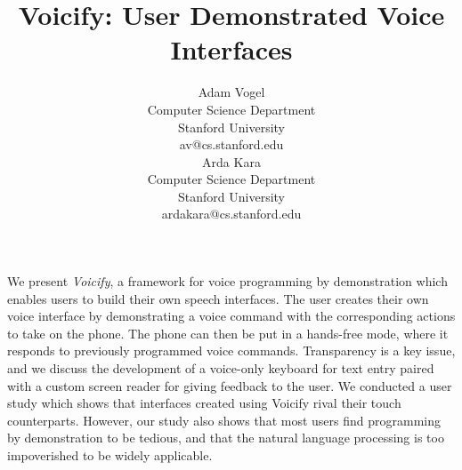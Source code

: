 \documentclass[letterpaper]{article}
\begin{document}




\title{Voicify: User Demonstrated Voice Interfaces}



\author{
\parbox[t]{9cm}{\centering
	     { Adam Vogel}\\
     Computer Science Department\\
             Stanford University \\
	     av@cs.stanford.edu}
\parbox[t]{9cm}{\centering
	     { Arda Kara}\\
	     Computer Science Department\\
       Stanford University\\
	     ardakara@cs.stanford.edu}
}

\maketitle

\abstract
We present \emph{Voicify}, a framework for voice programming by 
demonstration which enables users to build their own speech interfaces.
The user creates their own voice interface by demonstrating a voice command with the corresponding
actions to take on the phone. The phone can then be put in a hands-free mode, where it
responds to previously programmed voice commands. 
Transparency is a key issue, and we discuss the development of a voice-only keyboard for
text entry paired with a custom screen reader for giving feedback to the user.
We conducted a user study which shows that
interfaces created using Voicify rival their touch counterparts.
However, our study also shows that most users find programming by demonstration to be
tedious, and that the natural language processing is too impoverished to be widely applicable.
\end{document}
